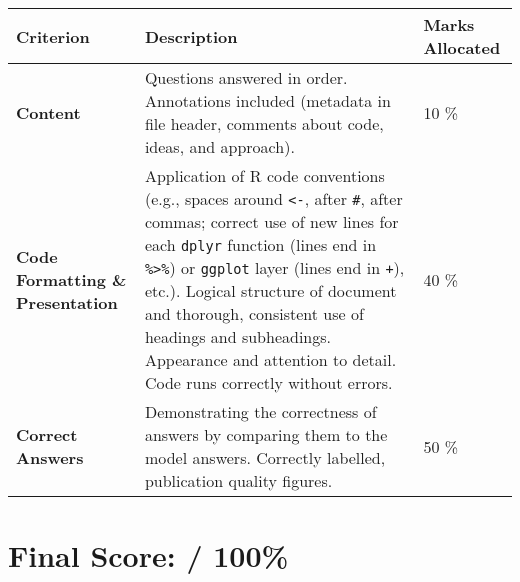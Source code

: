\documentclass[a4paper,10pt]{article}
\begin{document}
{\small
\begin{longtable}{R{3.5cm} R{8.5cm} R{3cm}}
    \toprule
    \textbf{Criterion} & \textbf{Description} & \textbf{Marks Allocated} \\
    \midrule
    \textbf{Content} & Questions answered in order. Annotations included (metadata in file header, comments about code, ideas, and approach). & 10 \% \\
    \textbf{Code Formatting \& Presentation} & Application of R code conventions (e.g., spaces around \texttt{<-}, after \texttt{\#}, after commas; correct use of new lines for each \texttt{dplyr} function (lines end in \texttt{\%>\%}) or \texttt{ggplot} layer (lines end in \texttt{+}), etc.). Logical structure of document and thorough, consistent use of headings and subheadings. Appearance and attention to detail. Code runs correctly without errors. & 40 \% \\
    \textbf{Correct Answers} & Demonstrating the correctness of answers by comparing them to the model answers. Correctly labelled, publication quality figures. & 50 \% \\
    \bottomrule
\end{longtable}}

\section*{Final Score: \underline{\hspace{2cm}} / 100\%}
\end{document}
